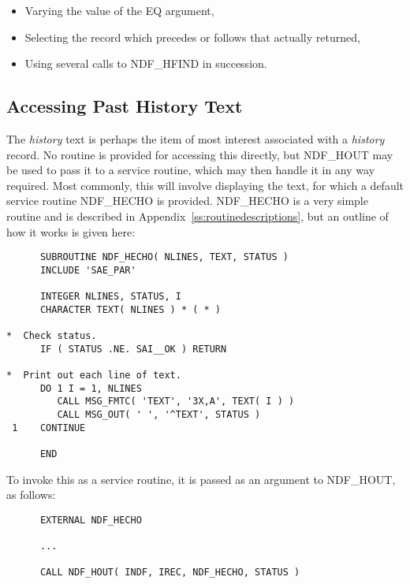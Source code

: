 \documentclass[twoside,11pt]{article}
\newcommand{\htmlref}[2]{#1}
\newcommand{\xlabel}[1]{}
\newcommand{\st}[1]{{\em{#1}}}
\begin{document}
\begin{itemize}

\item Varying the value of the EQ argument,

\item Selecting the record which precedes or follows that actually returned,

\item Using several calls to NDF\_HFIND in succession.

\end{itemize}

\subsection{\xlabel{accessing_past_history_text}Accessing Past History Text}

The \st{history\/} text is perhaps the item of most interest associated
with a \st{history\/} record. No routine is provided for accessing this
directly, but \htmlref{NDF\_HOUT}{NDF_HOUT} may be used to pass it to a service routine,
which may then handle it in any way required. Most commonly, this will
involve displaying the text, for which a default service routine
\htmlref{NDF\_HECHO}{NDF_HECHO} is provided. NDF\_HECHO is a very simple routine and is
described in Appendix~\ref{ss:routinedescriptions}, but an outline of
how it works is given here:

\small
\begin{verbatim}
      SUBROUTINE NDF_HECHO( NLINES, TEXT, STATUS )
      INCLUDE 'SAE_PAR'

      INTEGER NLINES, STATUS, I
      CHARACTER TEXT( NLINES ) * ( * )

*  Check status.
      IF ( STATUS .NE. SAI__OK ) RETURN

*  Print out each line of text.
      DO 1 I = 1, NLINES
         CALL MSG_FMTC( 'TEXT', '3X,A', TEXT( I ) )
         CALL MSG_OUT( ' ', '^TEXT', STATUS )
 1    CONTINUE

      END
\end{verbatim}
\normalsize

To invoke this as a service routine, it is passed as an argument to
NDF\_HOUT, as follows:

\small
\begin{verbatim}
      EXTERNAL NDF_HECHO

      ...

      CALL NDF_HOUT( INDF, IREC, NDF_HECHO, STATUS )
\end{verbatim}
\normalsize
\end{document}
